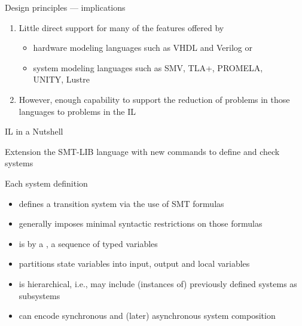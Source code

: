 \documentclass[10pt,aspectratio=149]{beamer}
\begin{document}

\begin{frame}{Design principles --- implications }
\large

\begin{enumerate}
\item
\alert{Little direct support} for many of the \alert{features} offered by 
\medskip

\begin{itemize}\normalsize
\item
hardware modeling languages such as VHDL and Verilog or
\medskip

\item
system modeling languages such as SMV, TLA+, PROMELA, \\
UNITY, Lustre
\end{itemize}
\bigskip
\bigskip
\pause

\item
However, enough \alert{capability to support} the \alert{reduction} of problems
in those languages \alert{to} problems in the \alert{IL}
\end{enumerate}

\end{frame}


\begin{frame}{IL in a Nutshell}

\alert{Extension} the \alert{SMT-LIB} language with \alert{new commands} to define and check systems

\bigskip
\smallskip
\pause

Each \alert{system definition}
\medskip

\begin{itemize}
\item<2,8>
defines a \alert{transition system} via the use of SMT formulas
\medskip

\item<3,8>
generally imposes \alert{minimal syntactic restrictions} on those formulas
\medskip

\item<4,8>
is  by a , a sequence of typed variables
\medskip

\item<5,8>
partitions state variables into \alert{input}, \alert{output} and \alert{local} variables
\medskip

\item<6,8>
is \alert{hierarchical}, i.e., may include (instances of) previously defined systems as subsystems 
\medskip

\item<7,8>
can \alert{encode} \alert{synchronous} \alert{and} (later) \alert{asynchronous} system composition
\end{itemize}

\end{frame}
\end{document}
